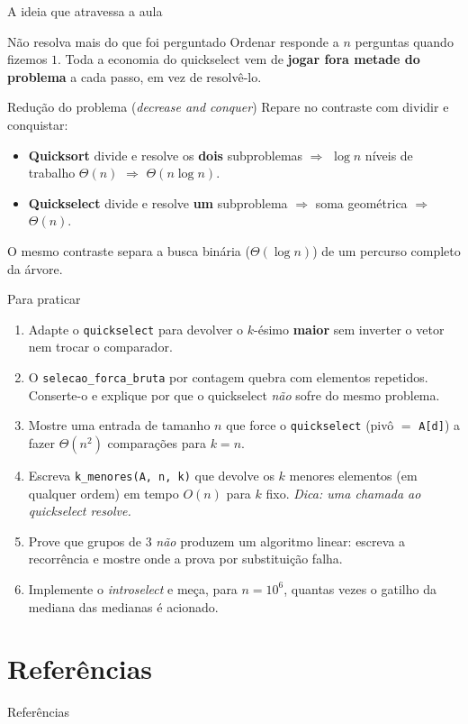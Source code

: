 \documentclass[aspectratio=169]{beamer}
\begin{document}
\begin{frame}{A ideia que atravessa a aula}
  \begin{block}{Não resolva mais do que foi perguntado}
    Ordenar responde a $n$ perguntas quando fizemos $1$. Toda a economia do
    quickselect vem de \textbf{jogar fora metade do problema} a cada passo, em
    vez de resolvê-lo.
  \end{block}

  \begin{block}{Redução do problema (\emph{decrease and conquer})}
    Repare no contraste com dividir e conquistar:
    \begin{itemize}
      \item \textbf{Quicksort} divide e resolve os \textbf{dois} subproblemas
            $\Rightarrow$ $\log n$ níveis de trabalho $\Theta(n)$
            $\Rightarrow$ $\Theta(n\log n)$.
      \item \textbf{Quickselect} divide e resolve \textbf{um} subproblema
            $\Rightarrow$ soma geométrica $\Rightarrow$ $\Theta(n)$.
    \end{itemize}
    O mesmo contraste separa a busca binária ($\Theta(\log n)$) de um percurso
    completo da árvore.
  \end{block}
\end{frame}

\begin{frame}[shrink=20]{Para praticar}
  \begin{enumerate}
    \item Adapte o \texttt{quickselect} para devolver o $k$-ésimo
          \textbf{maior} sem inverter o vetor nem trocar o comparador.
    \item O \texttt{selecao\_forca\_bruta} por contagem quebra com elementos
          repetidos. Conserte-o e explique por que o quickselect \emph{não}
          sofre do mesmo problema.
    \item Mostre uma entrada de tamanho $n$ que force o
          \texttt{quickselect} (pivô $=$ \texttt{A[d]}) a fazer
          $\Theta(n^2)$ comparações para $k = n$.
    \item Escreva \texttt{k\_menores(A, n, k)} que devolve os $k$ menores
          elementos (em qualquer ordem) em tempo $O(n)$ para $k$ fixo.
          \emph{Dica: uma chamada ao quickselect resolve.}
    \item Prove que grupos de $3$ \emph{não} produzem um algoritmo linear:
          escreva a recorrência e mostre onde a prova por substituição falha.
    \item Implemente o \emph{introselect} e meça, para $n = 10^6$, quantas
          vezes o gatilho da mediana das medianas é acionado.
  \end{enumerate}
\end{frame}

\section*{Referências}
\begin{frame}[allowframebreaks]{Referências}
  \nocite{*}
  
  
\end{frame}
\end{document}
